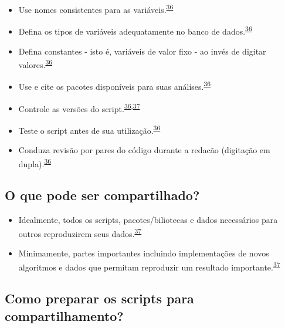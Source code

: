 \documentclass[
]{book}
\begin{document}
\begin{itemize}
\item
  Use nomes consistentes para as variáveis.\textsuperscript{\protect\hyperlink{ref-SchwabSimon2021}{36}}
\item
  Defina os tipos de variáveis adequatamente no banco de dados.\textsuperscript{\protect\hyperlink{ref-SchwabSimon2021}{36}}
\item
  Defina constantes - isto é, variáveis de valor fixo - ao invés de digitar valores.\textsuperscript{\protect\hyperlink{ref-SchwabSimon2021}{36}}
\item
  Use e cite os pacotes disponíveis para suas análises.\textsuperscript{\protect\hyperlink{ref-SchwabSimon2021}{36}}
\item
  Controle as versões do script.\textsuperscript{\protect\hyperlink{ref-SchwabSimon2021}{36},\protect\hyperlink{ref-Eglen2017}{37}}
\item
  Teste o script antes de sua utilização.\textsuperscript{\protect\hyperlink{ref-SchwabSimon2021}{36}}
\item
  Conduza revisão por pares do código durante a redacão (digitação em dupla).\textsuperscript{\protect\hyperlink{ref-SchwabSimon2021}{36}}
\end{itemize}

\hypertarget{o-que-pode-ser-compartilhado}{%
\subsection{O que pode ser compartilhado?}\label{o-que-pode-ser-compartilhado}}

\begin{itemize}
\item
  Idealmente, todos os scripts, pacotes/biliotecas e dados necessários para outros reproduzirem seus dados.\textsuperscript{\protect\hyperlink{ref-Eglen2017}{37}}
\item
  Minimamente, partes importantes incluindo implementações de novos algoritmos e dados que permitam reproduzir um resultado importante.\textsuperscript{\protect\hyperlink{ref-Eglen2017}{37}}
\end{itemize}

\hypertarget{como-preparar-os-scripts-para-compartilhamento}{%
\subsection{Como preparar os scripts para compartilhamento?}\label{como-preparar-os-scripts-para-compartilhamento}}
\end{document}

